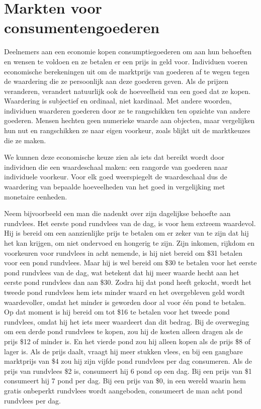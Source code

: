 \documentclass[
  a5paper,
  smalldemyvopaper,11pt,twoside,onecolumn,openright,extrafontsizes,
hidelinks]{memoir}
\begin{document}
\section{Markten voor
consumentengoederen}\label{markten-voor-consumentengoederen}

Deelnemers aan een economie kopen consumptiegoederen om aan hun
behoeften en wensen te voldoen en ze betalen er een prijs in geld voor.
Individuen voeren economische berekeningen uit om de marktprijs van
goederen af te wegen tegen de waardering die ze persoonlijk aan deze
goederen geven. Als de prijzen veranderen, verandert natuurlijk ook de
hoeveelheid van een goed dat ze kopen. Waardering is subjectief en
ordinaal, niet kardinaal. Met andere woorden, individuen waarderen
goederen door ze te rangschikken ten opzichte van andere goederen.
Mensen hechten geen numerieke waarde aan objecten, maar vergelijken hun
nut en rangschikken ze naar eigen voorkeur, zoals blijkt uit de
marktkeuzes die ze maken.

We kunnen deze economische keuze zien als iets dat bereikt wordt door
individuen die een waardeschaal maken: een rangorde van goederen naar
individuele voorkeur. Voor elk goed weerspiegelt de waardeschaal dus de
waardering van bepaalde hoeveelheden van het goed in vergelijking met
monetaire eenheden.

Neem bijvoorbeeld een man die nadenkt over zijn dagelijkse behoefte aan
rundvlees. Het eerste pond rundvlees van de dag, is voor hem extreem
waardevol. Hij is bereid om een aanzienlijke prijs te betalen om er
zeker van te zijn dat hij het kan krijgen, om niet ondervoed en hongerig
te zijn. Zijn inkomen, rijkdom en voorkeuren voor rundvlees in acht
nemende, is hij niet bereid om \$31 betalen voor een pond rundvlees.
Maar hij is wel bereid om \$30 te betalen voor het eerste pond rundvlees
van de dag, wat betekent dat hij meer waarde hecht aan het eerste pond
rundvlees dan aan \$30. Zodra hij dat pond heeft gekocht, wordt het
tweede pond rundvlees hem iets minder waard en het overgebleven geld
wordt waardevoller, omdat het minder is geworden door al voor één pond
te betalen. Op dat moment is hij bereid om tot \$16 te betalen voor het
tweede pond rundvlees, omdat hij het iets meer waardeert dan dit bedrag.
Bij de overweging om een derde pond rundvlees te kopen, zou hij de
kosten alleen dragen als de prijs \$12 of minder is. En het vierde pond
zou hij alleen kopen als de prijs \$8 of lager is. Als de prijs daalt,
vraagt hij meer stukken vlees, en bij een gangbare marktprijs van \$4
zou hij zijn vijfde pond rundvlees per dag consumeren. Als de prijs van
rundvlees \$2 is, consumeert hij 6 pond op een dag. Bij een prijs van
\$1 consumeert hij 7 pond per dag. Bij een prijs van \$0, in een wereld
waarin hem gratis onbeperkt rundvlees wordt aangeboden, consumeert de
man acht pond rundvlees per dag.
\end{document}
